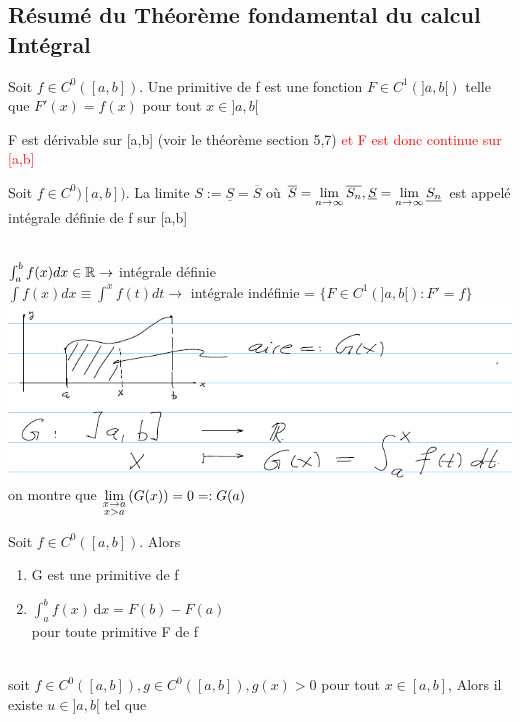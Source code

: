 \documentclass[12pt,a4paper]{article}
\begin{document}
{\subsection*{Résumé du Théorème fondamental du calcul Intégral}
\begin{boite}
	\Definition Soit $f \in C^0 ([a,b])$. Une primitive de f est une fonction $F \in C^1(]a,b[)$ telle que $F'(x) = f(x)$ pour tout $x \in ]a,b[$
\end{boite}
 F est dérivable sur [a,b] (voir le théorème section 5,7) \textcolor{red}{et F est donc continue sur [a,b]}
\begin{boite}
	\Definition Soit $f \in C^0)[a,b])$. La limite $S := \underline{S} = \overline{S}$ où $\overline{S} = \lim\limits_{n \to \infty}\overline{S_n}, \underline{S} = \lim\limits_{n \to \infty}\underline{S_n}$ est appelé intégrale définie de f sur [a,b]
\end{boite}
\\
$\int_a^b f(x) dx \in \mathbb{R}\to$ intégrale définie\\
$\int f(x) dx \equiv \int^x f(t)dt\to$ intégrale indéfinie = $\{F \in C^1(]a,b[) : F' = f\}$\\
\includegraphics[scale=0.5]{illustrations_analyse/notation_integrale}\\
on montre que $\lim\limits_{\substack{x\to a \\ x>a}}\left(G(x)\right) = 0 =: G(a)$
\begin{boite}
	\Theoreme Soit $f \in C^0 ([a,b])$. Alors 
	\begin{enumerate}[label=\roman*)]
		\item G est une primitive de f
		\item $\int_a^b f(x)\, \mathrm dx = F(b) - F(a)$\\
		pour toute primitive F de f
	\end{enumerate}
\end{boite}
\begin{boite}
\\
soit $f\in C^0([a,b]), g\in C^0([a,b]), g(x) > 0$ pour tout $x \in [a,b]$, Alors il existe $u \in ]a,b[$ tel que

\end{boite}}
\end{document}
